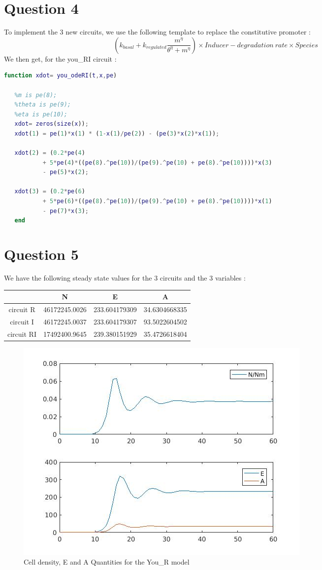 \documentclass[11pt,a4paper]{report}
\begin{document}
\section*{Question 4}
To implement the 3 new circuits, we use the following template to replace the constitutive promoter :
\[(k_{basal} + k_{regulated} \frac{m^{\eta}}{\theta^{\eta} + m^{\eta}}) \times Inducer - degradation~rate \times Species \]
 We then get, for the you\_RI circuit :
 \begin{lstlisting}[language=MatLab]
   function xdot= you_odeRI(t,x,pe)

   %m is pe(8);
   %theta is pe(9);
   %eta is pe(10);
   xdot= zeros(size(x));
   xdot(1) = pe(1)*x(1) * (1-x(1)/pe(2)) - (pe(3)*x(2)*x(1));

   xdot(2) = (0.2*pe(4)
           + 5*pe(4)*((pe(8).^pe(10))/(pe(9).^pe(10) + pe(8).^pe(10))))*x(3)
           - pe(5)*x(2);

   xdot(3) = (0.2*pe(6)
           + 5*pe(6)*((pe(8).^pe(10))/(pe(9).^pe(10) + pe(8).^pe(10))))*x(1)
           - pe(7)*x(3);
   end
 \end{lstlisting}

 \section*{Question 5}
We have the following steady state values for the 3 circuits and the 3 variables :\\

\begin{center}
\begin{tabular}{|c|c|c|c|}
  \hline
  ~ & N & E & A \\
  \hline
  circuit R & 46172245.0026 & 233.604179309 & 34.6304668335 \\
  \hline
  circuit I & 46172245.0037 & 233.604179307 & 93.5022604502 \\
  \hline
  circuit RI & 17492400.9645 & 239.380151929 & 35.4726618404\\
  \hline
\end{tabular}
\end{center}

\begin{figure}[!ht]
  \begin{center}
    \includegraphics[width=0.7\linewidth]{Figure2.jpg}
    \caption{Cell density, E and A Quantities for the You\_R model}
    \label{q5-R}
  \end{center}
\end{figure}
\end{document}
